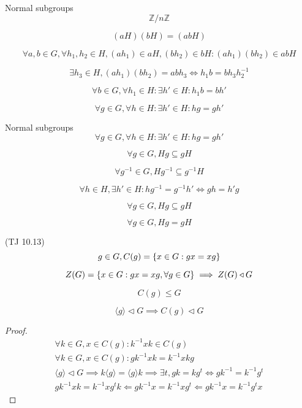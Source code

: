 \begin{frame}{Normal subgroups}
  \[
    \mathbb{Z}/n\mathbb{Z}
  \]

  \[
    (aH) (bH) = (abH)
  \]

  \[
  \forall a, b \in G, \forall h_1, h_2 \in H, (ah_1) \in aH, (bh_2) \in bH: (ah_1)(bh_2) \in abH
  \]

  \[
    \exists h_3 \in H, (ah_1)(bh_2) = abh_3 \iff h_1 b = bh_3h_2^{-1}
  \]

  \[
    \forall b \in G, \forall h_1 \in H: \exists h' \in H: h_1 b = bh'
  \]

  \[
    \forall g \in G, \forall h \in H: \exists h' \in H: hg = gh'
  \]
\end{frame}
\begin{frame}{Normal subgroups}
  \[
    \forall g \in G, \forall h \in H: \exists h' \in H: hg = gh'
  \]

  \[
    \forall g \in G, Hg \subseteq gH
  \]

  \[
    \forall g^{-1} \in G, Hg^{-1} \subseteq g^{-1}H
  \]

  \[
    \forall h \in H, \exists h' \in H: hg^{-1} = g^{-1}h' \iff gh = h'g
  \]

  \[
    \forall g \in G,  Hg \subseteq gH
  \]

  \[
    \forall g \in G,  Hg = gH
  \]
\end{frame}
\begin{frame}{(TJ 10.13)}
  \[
    g \in G, C(g) = \{x \in G: gx = xg\}
  \]

  \[
    Z(G) = \{x \in G: gx = xg,  \forall g \in G\} \implies Z(G) \triangleleft G
  \]

  \[
    C(g) \le G
  \]

  \[
    \langle g \rangle \triangleleft G \implies C(g) \triangleleft G
  \]

  \begin{proof}
    \begin{align*}
      \forall k \in G, x \in C(g): k^{-1} x k \in C(g) \\
      \forall k \in G, x \in C(g): gk^{-1}xk = k^{-1}xkg \\
      \langle g \rangle \triangleleft G \implies k \langle g \rangle = \langle g \rangle k \implies
      \exists t, gk = kg^{t} \iff g k^{-1} = k^{-1} g^t \\
      gk^{-1}xk = k^{-1}xg^{t}k \Leftarrow gk^{-1}x = k^{-1}xg^{t} \Leftarrow gk^{-1}x = k^{-1}g^{t}x
    \end{align*}
  \end{proof}
\end{frame}
